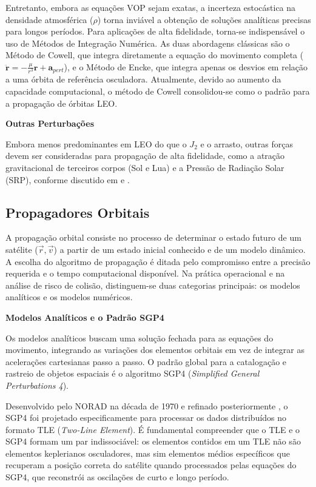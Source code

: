 Entretanto, embora as equações VOP sejam exatas, a incerteza estocástica na densidade atmosférica ($\rho$) torna inviável a obtenção de soluções analíticas precisas para longos períodos. Para aplicações de alta fidelidade, torna-se indispensável o uso de Métodos de Integração Numérica. As duas abordagens clássicas são o Método de Cowell, que integra diretamente a equação do movimento completa ($\ddot{\mathbf{r}} = -\frac{\mu}{r^3}\mathbf{r} + \mathbf{a}_{pert}$), e o Método de Encke, que integra apenas os desvios em relação a uma órbita de referência osculadora. Atualmente, devido ao aumento da capacidade computacional, o método de Cowell consolidou-se como o padrão para a propagação de órbitas LEO.

\vspace{0.5cm}
\noindent \textbf{Outras Perturbações}

Embora menos predominantes em LEO do que o $J_2$ e o arrasto, outras forças devem ser consideradas para propagação de alta fidelidade, como a atração gravitacional de terceiros corpos (Sol e Lua) e a Pressão de Radiação Solar (SRP), conforme discutido em  e .

\subsection{Propagadores Orbitais}
\label{subsec:propagadores}

A propagação orbital consiste no processo de determinar o estado futuro de um satélite ($\vec{r}, \vec{v}$) a partir de um estado inicial conhecido e de um modelo dinâmico. A escolha do algoritmo de propagação é ditada pelo compromisso entre a precisão requerida e o tempo computacional disponível. Na prática operacional e na análise de risco de colisão, distinguem-se duas categorias principais: os modelos analíticos e os modelos numéricos.


\noindent \textbf{Modelos Analíticos e o Padrão SGP4}

Os modelos analíticos buscam uma solução fechada para as equações do movimento, integrando as variações dos elementos orbitais em vez de integrar as acelerações cartesianas passo a passo. O padrão global para a catalogação e rastreio de objetos espaciais é o algoritmo SGP4 (\textit{Simplified General Perturbations 4}).

Desenvolvido pelo NORAD na década de 1970 e refinado posteriormente \cite{Hoots1980, Vallado2006_TLE}, o SGP4 foi projetado especificamente para processar os dados distribuídos no formato TLE (\textit{Two-Line Element}). É fundamental compreender que o TLE e o SGP4 formam um par indissociável: os elementos contidos em um TLE não são elementos keplerianos osculadores, mas sim elementos médios específicos que recuperam a posição correta do satélite quando processados pelas equações do SGP4, que reconstrói as oscilações de curto e longo período.

